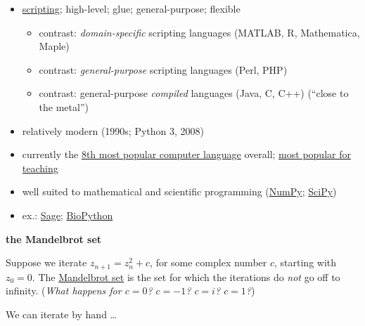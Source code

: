 \documentclass[]{tufte-handout}
\begin{document}
\begin{itemize}
\itemsep1pt\parskip0pt
\item
  \href{http://en.wikipedia.org/wiki/Scripting_language}{scripting};
  high-level; glue; general-purpose; flexible

  \begin{itemize}
  \itemsep1pt\parskip0pt
  \item
    contrast: \emph{domain-specific} scripting languages (MATLAB, R,
    Mathematica, Maple)
  \item
    contrast: \emph{general-purpose} scripting languages (Perl, PHP)
  \item
    contrast: general-purpose \emph{compiled} languages (Java, C, C++)
    (``close to the metal'')
  \end{itemize}
\item
  relatively modern (1990s; Python 3, 2008)
\item
  currently the
  \href{http://www.tiobe.com/index.php/content/paperinfo/tpci/index.html}{8th
  most popular computer language} overall;
  \href{http://cacm.acm.org/blogs/blog-cacm/176450-python-is-now-the-most-popular-introductory-teaching-language-at-top-us-universities/fulltext}{most
  popular for teaching}
\item
  well suited to mathematical and scientific programming
  (\href{http://www.numpy.org}{NumPy};
  \href{http://www.scipy.org}{SciPy})
\item
  ex.: \href{http://www.sagemath.org}{Sage};
  \href{http://www.biopython.org}{BioPython}
\end{itemize}

\textbf{the Mandelbrot set}

Suppose we iterate \(z_{n+1}=z_{n}^2+c\), for some complex number \(c\),
starting with \(z_0=0\). The
\href{https://en.wikipedia.org/wiki/Mandelbrot_set}{Mandelbrot set} is
the set for which the iterations do \emph{not} go off to infinity.
(\emph{What happens for \(c=0\)? \(c=-1\)? \(c=i\)? \(c=1\)?})

We can iterate by hand \ldots{}
\end{document}
